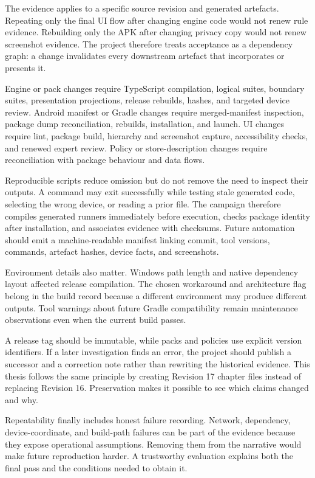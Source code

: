 The evidence applies to a specific source revision and generated artefacts. Repeating only the final UI flow after changing engine code would not renew rule evidence. Rebuilding only the APK after changing privacy copy would not renew screenshot evidence. The project therefore treats acceptance as a dependency graph: a change invalidates every downstream artefact that incorporates or presents it.

Engine or pack changes require TypeScript compilation, logical suites, boundary suites, presentation projections, release rebuilds, hashes, and targeted device review. Android manifest or Gradle changes require merged-manifest inspection, package dump reconciliation, rebuilds, installation, and launch. UI changes require lint, package build, hierarchy and screenshot capture, accessibility checks, and renewed expert review. Policy or store-description changes require reconciliation with package behaviour and data flows.

Reproducible scripts reduce omission but do not remove the need to inspect their outputs. A command may exit successfully while testing stale generated code, selecting the wrong device, or reading a prior file. The campaign therefore compiles generated runners immediately before execution, checks package identity after installation, and associates evidence with checksums. Future automation should emit a machine-readable manifest linking commit, tool versions, commands, artefact hashes, device facts, and screenshots.

Environment details also matter. Windows path length and native dependency layout affected release compilation. The chosen workaround and architecture flag belong in the build record because a different environment may produce different outputs. Tool warnings about future Gradle compatibility remain maintenance observations even when the current build passes.

A release tag should be immutable, while packs and policies use explicit version identifiers. If a later investigation finds an error, the project should publish a successor and a correction note rather than rewriting the historical evidence. This thesis follows the same principle by creating Revision 17 chapter files instead of replacing Revision 16. Preservation makes it possible to see which claims changed and why.

Repeatability finally includes honest failure recording. Network, dependency, device-coordinate, and build-path failures can be part of the evidence because they expose operational assumptions. Removing them from the narrative would make future reproduction harder. A trustworthy evaluation explains both the final pass and the conditions needed to obtain it.

